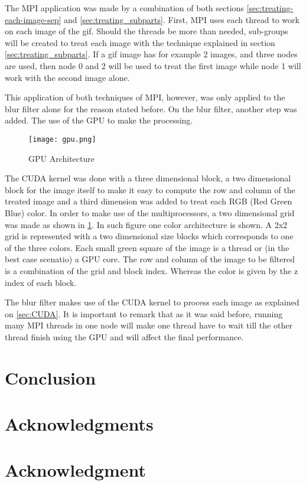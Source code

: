\documentclass[conference,compsoc]{IEEEtran}
\begin{document}
The MPI application was made by a combination of both sections \ref{sec:treating-each-image-sep} and \ref{sec:treating_subparts}. First, MPI uses each thread to work on each image of the gif. Should the threads be more than needed, sub-groups will be created to treat each image with the technique explained in section  \ref{sec:treating_subparts}. If a gif image has for example 2 images, and three nodes are used, then node 0 and 2 will be used to treat the first image while node 1 will work with the second image alone.

This application of both techniques of MPI, however, was only applied to the blur filter alone for the reason stated before. On the blur filter, another step was added. The use of the GPU to make the processing.

\begin{figure}[H]
	\texttt{[image: gpu.png]}	\centering
	\caption{GPU Architecture \label{fig:GPU-Architecture}}
\end{figure}

The CUDA kernel was done with a three dimensional block, a two dimensional block for the image itself to make it easy to compute the row and column of the treated image and a third dimension was added to treat each RGB (Red Green Blue) color. In order to make use of the multiprocessors, a two dimensional grid was made as shown in \ref{fig:GPU-Architecture}. In such figure one color architecture is shown. A 2x2 grid is represented with a two dimensional size blocks which corresponds to one of the three colors. Each small green square of the image is a thread or (in the best case scenatio) a GPU core. The row and column of the image to be filtered is a combination of the grid and block index. Whereas the color is given by the z index of each block.

The blur filter makes use of the CUDA kernel to process each image as explained on \ref{sec:CUDA}. It is important to remark that as it was said before, running many MPI threads in one node will make one thread have to wait till the other thread finish using the GPU and will affect the final performance.

\section{Conclusion}

\ifCLASSOPTIONcompsoc
  \section*{Acknowledgments}
\else
  \section*{Acknowledgment}
\fi

\newpage
{}


\end{document}
